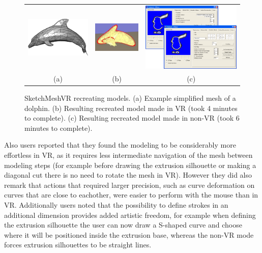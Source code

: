 \begin{figure}[!h]
    \centering
    \setlength{\tabcolsep}{0.0130\linewidth}
    \begin{tabular}{@{}ccc@{}}
    \includegraphics[width=0.3\linewidth]{figures/example_model_dolphin}&
  	\includegraphics[width=0.3\linewidth]{figures/results_dolphin_model}&
  	\includegraphics[width=0.3\linewidth]{figures/voldiff_ui}\\

    (a)&(b)&(c)\\
    \end{tabular}
    \caption[SketchMeshVR dolphin model]{SketchMeshVR recreating models.
    	  \textup{(a)} Example simplified mesh of a dolphin.
	  \textup{(b)} Resulting recreated model made in VR (took 4 minutes to complete).
	  \textup{(c)} Resulting recreated model made in non-VR (took 6 minutes to complete).
      \label{fig:recreate_dolphin}}
\end{figure}


Also users reported that they found the modeling to be considerably more effortless in VR, as it requires less intermediate navigation of the mesh between modeling steps (for example before drawing the extrusion silhouette or making a diagonal cut there is no need to rotate the mesh in VR). However they did also remark that actions that required larger precision, such as curve deformation on curves that are close to eachother, were easier to perform with the mouse than in VR.
Additionally users noted that the possibility to define strokes in an additional dimension provides added artistic freedom, for example when defining the extrusion silhouette the user can now draw a S-shaped curve and choose where it will be positioned inside the extrusion base, whereas the non-VR mode forces extrusion silhouettes to be straight lines. 
